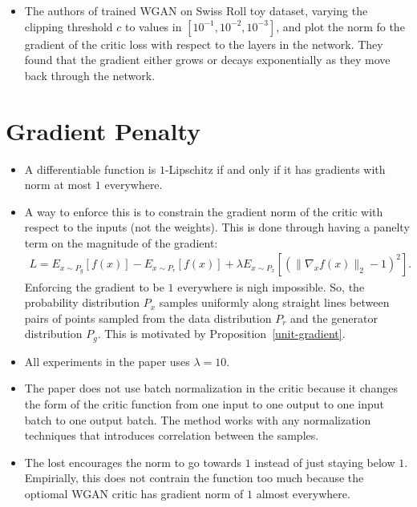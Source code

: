 \documentclass[10pt]{article}
\begin{document}
  \begin{itemize}
  	\item The authors of \cite{Gulrajani:2017} trained WGAN on Swiss Roll toy dataset, varying the clipping threshold $c$ to values in $[10^{-1}, 10^{-2}, 10^{-3}]$, and plot the norm fo the gradient of the critic loss with respect to the layers in the network. They found that the gradient either grows or decays exponentially as they move back through the network.
  \end{itemize}

  \section{Gradient Penalty}

  \begin{itemize}
  	\item A differentiable function is $1$-Lipschitz if and only if it has gradients with norm at most $1$ everywhere.

  	\item A way to enforce this is to constrain the gradient norm of the critic with respect to the inputs (not the weights). This is done through having a panelty term on the magnitude of the gradient:
  	\begin{align*}
  		L = E_{x \sim P_g} [f(x)] - E_{x \sim P_r} [f(x)] + \lambda E_{x \sim P_x} [(\| \nabla_x f(x) \|_2 - 1)^2].
  	\end{align*}
  	Enforcing the gradient to be $1$ everywhere is nigh impossible. So, the probability distribution $P_x$ samples uniformly along straight lines between pairs of points sampled from the data distribution $P_r$ and the generator distribution $P_g$. This is motivated by Proposition~\ref{unit-gradient}.

  	\item All experiments in the paper uses $\lambda = 10$.

  	\item The paper does not use batch normalization in the critic because it changes the form of the critic function from one input to one output to one input batch to one output batch. The method works with any normalization techniques that introduces correlation between the samples.

  	\item The lost encourages the norm to go towards $1$ instead of just staying below $1$. Empirially, this does not contrain the function too much because the optiomal WGAN critic has gradient norm of $1$ almost everywhere.
  \end{itemize}

  
    
\end{document}
